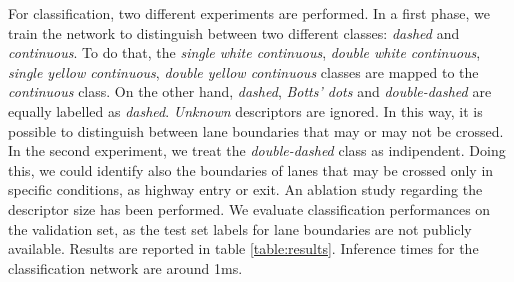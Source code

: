 \documentclass[runningheads]{llncs}
\begin{document}
For classification, two different experiments are performed. In a first phase, we train the network to distinguish between two different classes: \textit{dashed} and \textit{continuous}. To do that, the \textit{single white continuous}, \textit{double white continuous}, \textit{single yellow continuous}, \textit{double yellow continuous} classes are mapped to the \textit{continuous} class. On the other hand, \textit{dashed}, \textit{Botts' dots} and \textit{double-dashed} are equally labelled as \textit{dashed}. \textit{Unknown} descriptors are ignored. In this way, it is possible to distinguish between lane boundaries that may or may not be crossed. In the second experiment, we treat the \textit{double-dashed} class as indipendent. Doing this, we could identify also the boundaries of lanes that may be crossed only in specific conditions, as highway entry or exit. An ablation study regarding the descriptor size has been performed. We evaluate classification performances on the validation set, as the test set labels for lane boundaries are not publicly available. Results are reported in table \ref{table:results}. Inference times for the classification network are around 1ms.
\end{document}
